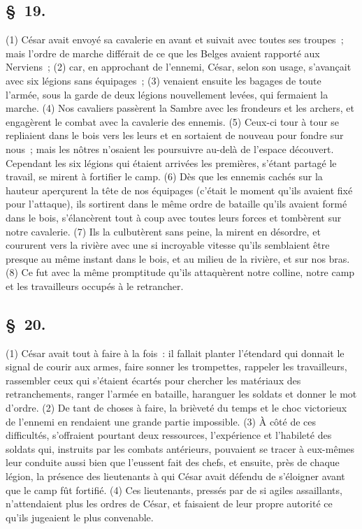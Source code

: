 \documentclass[french,twoside]{book} %
\begin{document}
\subsection[{§ 19.}]{ \textsc{§ 19.} }
\noindent (1) César avait envoyé sa cavalerie en avant et suivait avec toutes ses troupes ; mais l’ordre de marche différait de ce que les Belges avaient rapporté aux Nerviens ; (2) car, en approchant de l’ennemi, César, selon son usage, s’avançait avec six légions sans équipages ; (3) venaient ensuite les bagages de toute l’armée, sous la garde de deux légions nouvellement levées, qui fermaient la marche. (4) Nos cavaliers passèrent la Sambre avec les frondeurs et les archers, et engagèrent le combat avec la cavalerie des ennemis. (5) Ceux-ci tour à tour se repliaient dans le bois vers les leurs et en sortaient de nouveau pour fondre sur nous ; mais les nôtres n’osaient les poursuivre au-delà de l’espace découvert. Cependant les six légions qui étaient arrivées les premières, s’étant partagé le travail, se mirent à fortifier le camp. (6) Dès que les ennemis cachés sur la hauteur aperçurent la tête de nos équipages (c’était le moment qu’ils avaient fixé pour l’attaque), ils sortirent dans le même ordre de bataille qu’ils avaient formé dans le bois, s’élancèrent tout à coup avec toutes leurs forces et tombèrent sur notre cavalerie. (7) Ils la culbutèrent sans peine, la mirent en désordre, et coururent vers la rivière avec une si incroyable vitesse qu’ils semblaient être presque au même instant dans le bois, et au milieu de la rivière, et sur nos bras. (8) Ce fut avec la même promptitude qu’ils attaquèrent notre colline, notre camp et les travailleurs occupés à le retrancher.
\subsection[{§ 20.}]{ \textsc{§ 20.} }
\noindent (1) César avait tout à faire à la fois : il fallait planter l’étendard qui donnait le signal de courir aux armes, faire sonner les trompettes, rappeler les travailleurs, rassembler ceux qui s’étaient écartés pour chercher les matériaux des retranchements, ranger l’armée en bataille, haranguer les soldats et donner le mot d’ordre. (2) De tant de choses à faire, la brièveté du temps et le choc victorieux de l’ennemi en rendaient une grande partie impossible. (3) À côté de ces difficultés, s’offraient pourtant deux ressources, l’expérience et l’habileté des soldats qui, instruits par les combats antérieurs, pouvaient se tracer à eux-mêmes leur conduite aussi bien que l’eussent fait des chefs, et ensuite, près de chaque légion, la présence des lieutenants à qui César avait défendu de s’éloigner avant que le camp fût fortifié. (4) Ces lieutenants, pressés par de si agiles assaillants, n’attendaient plus les ordres de César, et faisaient de leur propre autorité ce qu’ils jugeaient le plus convenable.
\end{document}
